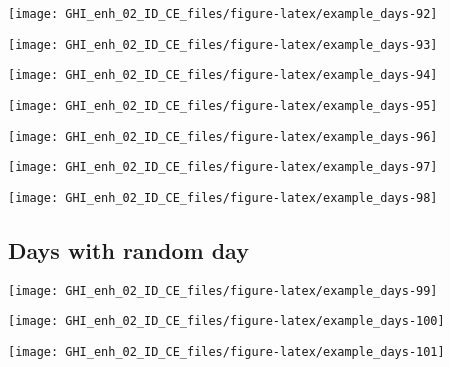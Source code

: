 \documentclass[
  10pt,
  a4paper,oneside]{article}
\begin{document}
\begin{center}\texttt{[image: GHI\_enh\_02\_ID\_CE\_files/figure-latex/example\_days-92]} \end{center}

\begin{center}\texttt{[image: GHI\_enh\_02\_ID\_CE\_files/figure-latex/example\_days-93]} \end{center}

\begin{center}\texttt{[image: GHI\_enh\_02\_ID\_CE\_files/figure-latex/example\_days-94]} \end{center}

\begin{center}\texttt{[image: GHI\_enh\_02\_ID\_CE\_files/figure-latex/example\_days-95]} \end{center}

\begin{center}\texttt{[image: GHI\_enh\_02\_ID\_CE\_files/figure-latex/example\_days-96]} \end{center}

\begin{center}\texttt{[image: GHI\_enh\_02\_ID\_CE\_files/figure-latex/example\_days-97]} \end{center}

\begin{center}\texttt{[image: GHI\_enh\_02\_ID\_CE\_files/figure-latex/example\_days-98]} \end{center}

\FloatBarrier

\hypertarget{days-with-random-day}{%
\subsection{Days with random day}\label{days-with-random-day}}

\begin{center}\texttt{[image: GHI\_enh\_02\_ID\_CE\_files/figure-latex/example\_days-99]} \end{center}

\begin{center}\texttt{[image: GHI\_enh\_02\_ID\_CE\_files/figure-latex/example\_days-100]} \end{center}

\begin{center}\texttt{[image: GHI\_enh\_02\_ID\_CE\_files/figure-latex/example\_days-101]} \end{center}
\end{document}
